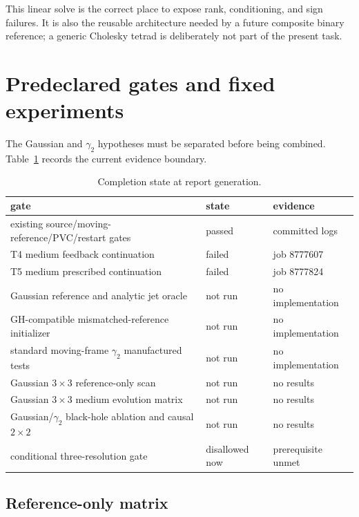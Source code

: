 \documentclass[11pt]{article}
\newcommand{\notrun}{\textcolor{red!65!black}{not run}}
\newcommand{\passed}{\textcolor{green!45!black}{passed}}
\newcommand{\failed}{\textcolor{red!65!black}{failed}}
\begin{document}
This linear solve is the correct place to expose rank, conditioning, and sign
failures.  It is also the reusable architecture needed by a future composite
binary reference; a generic Cholesky tetrad is deliberately not part of the
present task.

\section{Predeclared gates and fixed experiments}
\label{sec:gates}

The Gaussian and $\gamma_2$ hypotheses must be separated before being
combined.  Table~\ref{tab:status} records the current evidence boundary.

\begin{table}[h]
\centering
\caption{Completion state at report generation.}
\label{tab:status}
\begin{tabular}{p{}p{}p{}}
\toprule
gate & state & evidence \\
\midrule
existing source/moving-reference/PVC/restart gates & \passed & committed logs \\
T4 medium feedback continuation & \failed & job 8777607 \\
T5 medium prescribed continuation & \failed & job 8777824 \\
Gaussian reference and analytic jet oracle & \notrun & no implementation \\
GH-compatible mismatched-reference initializer & \notrun & no implementation \\
standard moving-frame $\gamma_2$ manufactured tests & \notrun & no implementation \\
Gaussian $3\times3$ reference-only scan & \notrun & no results \\
Gaussian $3\times3$ medium evolution matrix & \notrun & no results \\
Gaussian/$\gamma_2$ black-hole ablation and causal $2\times2$ & \notrun & no results \\
conditional three-resolution gate & disallowed now & prerequisite unmet \\
\bottomrule
\end{tabular}
\end{table}

\subsection{Reference-only matrix}
\end{document}

